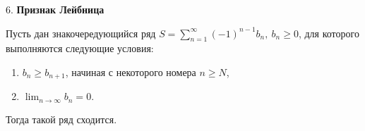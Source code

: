 6. \textbf{Признак Лейбница}

Пусть дан знакочередующийся ряд ${\displaystyle S=\sum _{n=1}^{\infty }(-1)^{n-1}b_{n},\ b_{n}\geq 0}$, для которого выполняются следующие условия:
\begin{enumerate}
    \item ${\displaystyle b_{n}\geq b_{n+1}}$, начиная с некоторого номера ${\displaystyle n\geq N}$,
    \item ${\displaystyle \lim _{n\to \infty }b_{n}=0.}$
\end{enumerate}
Тогда такой ряд сходится.


